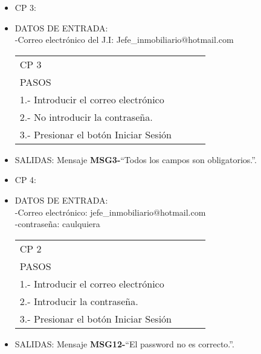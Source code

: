 \begin{itemize}
\item CP 3:
\item DATOS DE ENTRADA:\\
	-Correo electrónico del J.I: Jefe\_inmobiliario$@$hotmail.com
\begin{center}			
	\begin{tabular}{|l|l|l|l|}
		\hline
		CP 3\\
		PASOS\\
		\hline 1.- Introducir el correo electrónico\\
		\hline 2.- No introducir la contraseña.\\
		\hline 3.- Presionar el botón Iniciar Sesión\\
		\hline
	\end{tabular}
\end{center}
\item SALIDAS:  Mensaje {\bf MSG3-}``Todos los campos son obligatorios.''.
\item CP 4:
\item DATOS DE ENTRADA:\\
-Correo electrónico: jefe\_inmobiliario$@$hotmail.com\\
-contraseña: caulquiera
\begin{center}			
	\begin{tabular}{|l|l|l|l|}
		\hline
		CP 2\\
		PASOS\\
		\hline 1.- Introducir el correo electrónico\\
		\hline 2.- Introducir la contraseña.\\
		\hline 3.- Presionar el botón Iniciar Sesión\\
		\hline
	\end{tabular}
\end{center}
\item SALIDAS: Mensaje {\bf MSG12-}``El password no es correcto.''.
\end{itemize}

